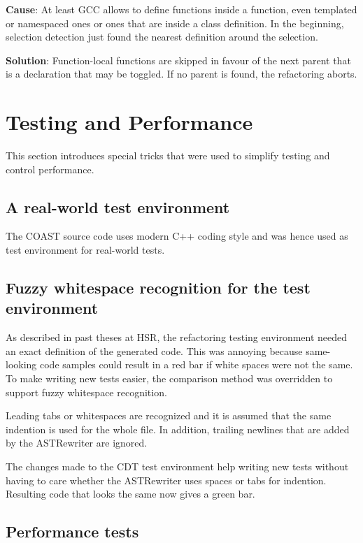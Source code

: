 \textbf{Cause}: At least GCC allows to define functions inside a function, even 
templated or namespaced ones or ones that are inside a class definition. In the 
beginning, selection detection just found the nearest definition around the 
selection.

\textbf{Solution}: Function-local functions are skipped in favour of the next 
parent that is a declaration that may be toggled. If no parent is found, the 
refactoring aborts.


\section{Testing and Performance}

This section introduces special tricks that were used to simplify testing and
control performance.

\subsection{A real-world test environment}
The COAST source code uses modern C++ coding style and was hence used as test 
environment for real-world tests.

\subsection{Fuzzy whitespace recognition for the test environment}

As described in past theses at HSR, the refactoring testing environment
needed an exact definition of the generated code. This was annoying because
same-looking code samples could result in a red bar if white spaces were not the
same. To make writing new tests easier, the comparison method was overridden to
support fuzzy whitespace recognition.

Leading tabs or whitespaces are recognized and it is assumed that the same
indention is used for the whole file. In addition, trailing newlines that are
added by the ASTRewriter are ignored.

The changes made to the CDT test environment help writing new tests without
having to care whether the ASTRewriter uses spaces or tabs for indention.
Resulting code that looks the same now gives a green bar.

\subsection{Performance tests}

